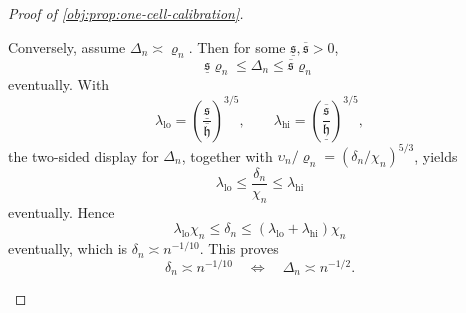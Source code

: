 \documentclass[11pt]{article}
\begin{document}
\begin{proof}[Proof of \cref{obj:prop:one-cell-calibration}]
\begin{enumerate}
Conversely, assume \(\Delta_n\asymp\varrho_n\).  Then for some
\(\underline{\mathfrak s},\overline{\mathfrak s}>0\),
\[
\underline{\mathfrak s}\varrho_n
\le
\Delta_n
\le
\overline{\mathfrak s}\varrho_n
\]
eventually.  With
\[
\lambda_{\mathrm{lo}}
=
\left(\frac{\underline{\mathfrak s}}{\overline{\mathfrak h}}\right)^{3/5},
\qquad
\lambda_{\mathrm{hi}}
=
\left(\frac{\overline{\mathfrak s}}{\underline{\mathfrak h}}\right)^{3/5},
\]
the two-sided display for \(\Delta_n\), together with
\(\upsilon_n/\varrho_n=(\delta_n/\chi_n)^{5/3}\), yields
\[
\lambda_{\mathrm{lo}}
\le
\frac{\delta_n}{\chi_n}
\le
\lambda_{\mathrm{hi}}
\]
eventually.  Hence
\[
\lambda_{\mathrm{lo}}\chi_n
\le
\delta_n
\le
(\lambda_{\mathrm{lo}}+\lambda_{\mathrm{hi}})\chi_n
\]
eventually, which is \(\delta_n\asymp n^{-1/10}\).  This proves
\[
\delta_n\asymp n^{-1/10}
\quad\Longleftrightarrow\quad
\Delta_n\asymp n^{-1/2}.
\]
\end{enumerate}
\end{proof}
\end{document}
